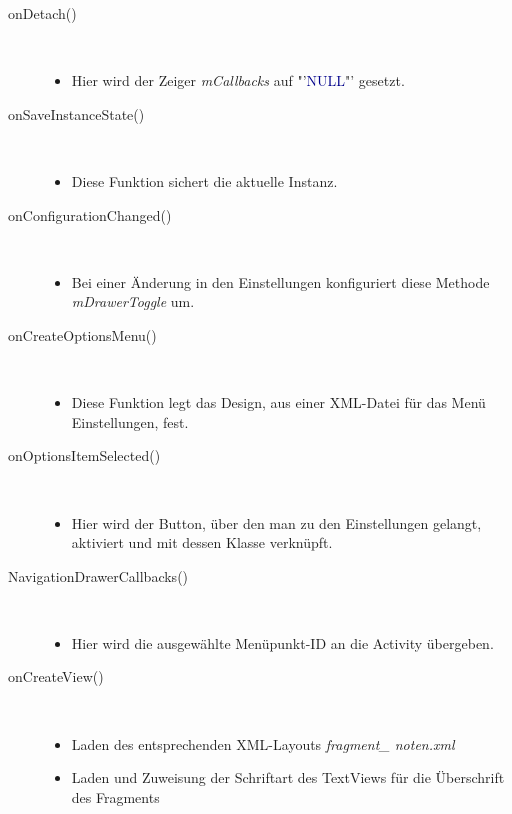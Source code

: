 \begin{description}
\item[onDetach()]~\par
\begin{itemize}
\item Hier wird der Zeiger \textit{mCallbacks} auf "'\textcolor{darkblue}{NULL}"' gesetzt.
\end{itemize}
\item[onSaveInstanceState()]~\par
\begin{itemize}
\item Diese Funktion sichert die aktuelle Instanz.
\end{itemize}
\item[onConfigurationChanged()]~\par
\begin{itemize}
\item Bei einer Änderung in den Einstellungen konfiguriert diese Methode \textit{mDrawerToggle} um.
\end{itemize} 
\item[onCreateOptionsMenu()]~\par
\begin{itemize}
\item Diese Funktion legt das Design, aus einer XML-Datei für das Menü Einstellungen, fest.
\end{itemize} 
\item[onOptionsItemSelected()]~\par
\begin{itemize}
\item Hier wird der Button, über den man zu den Einstellungen gelangt, aktiviert und mit dessen Klasse verknüpft.
\end{itemize}
\item[NavigationDrawerCallbacks()]~\par
\begin{itemize}
\item Hier wird die ausgewählte Menüpunkt-ID an die Activity übergeben.
\end{itemize}
\newpage
{}
\item[onCreateView()]~\par
\begin{itemize}
\item Laden des entsprechenden XML-Layouts \textit{fragment\_ noten.xml}
\item Laden und Zuweisung der Schriftart des TextViews für die Überschrift des Fragments
\end{itemize}


\end{description}
